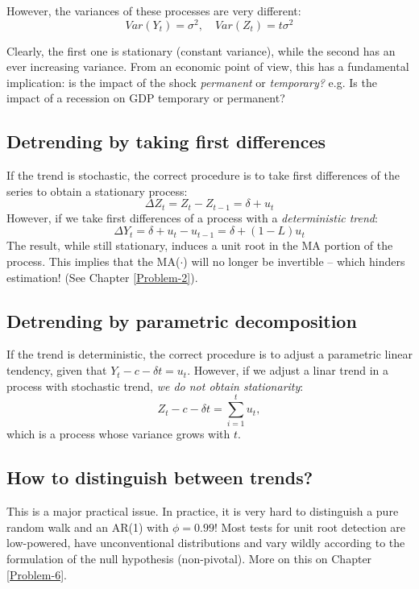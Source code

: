 \documentclass[11pt, a4paper]{report}
\theoremstyle{plain}
\theoremstyle{plain}
\theoremstyle{remark}
\begin{document}
However, the variances of these processes are very different:
$$ Var(Y_t) = \sigma^2, \hspace{1em} Var(Z_t) = t \sigma^2 $$

Clearly, the first one is stationary (constant variance), while the second has an ever increasing variance. From an economic point of view, this has a fundamental implication: is the impact of the shock \textit{permanent} or \textit{temporary?} e.g. Is the impact of a recession on GDP temporary or permanent?

\subsection{Detrending by taking first differences}

If the trend is stochastic, the correct procedure is to take first differences of the series to obtain a stationary process:
$$
\Delta Z_{t}=Z_{t}-Z_{t-1}=\delta+u_{t}
$$
However, if we take first differences of a process with a \textit{deterministic trend}:
$$
\Delta Y_{t}=\delta+u_{t}-u_{t-1}=\delta+(1-L) u_{t}
$$
The result, while still stationary, induces a unit root in the MA portion of the process. This implies that the MA($\cdot$) will no longer be invertible -- which hinders estimation! (See Chapter \ref{Problem-2}).

\subsection{Detrending by parametric decomposition}

If the trend is deterministic, the correct procedure is to adjust a parametric linear tendency, given that $Y_t - c - \delta t = u_t $. However, if we adjust a linar trend in a process with stochastic trend, \textit{we do not obtain stationarity}:
$$ Z_t - c - \delta t = \sum_{i=1}^{t} u_t, $$
which is a process whose variance grows with $t$.

\subsection{How to distinguish between trends?}

This is a major practical issue. In practice, it is very hard to distinguish a pure random walk and an AR(1) with $\phi = 0.99$! Most tests for unit root detection are low-powered, have unconventional distributions and vary wildly according to the formulation of the null hypothesis (non-pivotal). More on this on Chapter \ref{Problem-6}.
\end{document}
